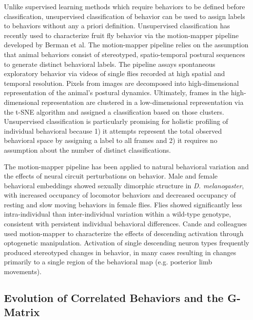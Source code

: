 \documentclass[12pt,letterpaper]{article}
\begin{document}
Unlike supervised learning methods which require behaviors to be defined before classification, unsupervised classification of behavior can be used to assign labels to behaviors without any a priori definition. Unsupervised classification has recently used to characterize fruit fly behavior via the motion-mapper pipeline developed by Berman et al. The motion-mapper pipeline relies on the assumption that animal behaviors consist of stereotyped, spatio-temporal postural sequences to generate distinct behavioral labels. The pipeline assays spontaneous exploratory behavior via videos of single flies recorded at high spatial and temporal resolution. Pixels from images are decomposed into high-dimensional representation of the animal's postural dynamics. Ultimately, frames in the high-dimensional representation are clustered in a low-dimensional representation via the t-SNE algorithm and assigned a classification based on those clusters. Unsupervised classification is particularly promising for holistic profiling of individual behavioral because 1) it attempts represent the total observed behavioral space by assigning a label to all frames and 2) it requires no assumption about the number of distinct classifications.

The motion-mapper pipeline has been applied to natural behavioral variation and the effects of neural circuit perturbations on behavior. Male and female behavioral embeddings showed sexually dimorphic structure in \textit{D. melanogaster}, with increased occupancy of locomotor behaviors and decreased occupancy of resting and slow moving behaviors in female flies. Flies showed significantly less intra-individual than inter-individual variation within a wild-type genotype, consistent with persistent individual behavioral differences. Cande and colleagues used motion-mapper to characterize the effects of descending activation through optogenetic manipulation. Activation of single descending neuron types frequently produced stereotyped changes in behavior, in many cases resulting in changes primarily to a single region of the behavioral map (e.g. posterior limb movements).

\subsection{Evolution of Correlated Behaviors and the G-Matrix}
\end{document}
